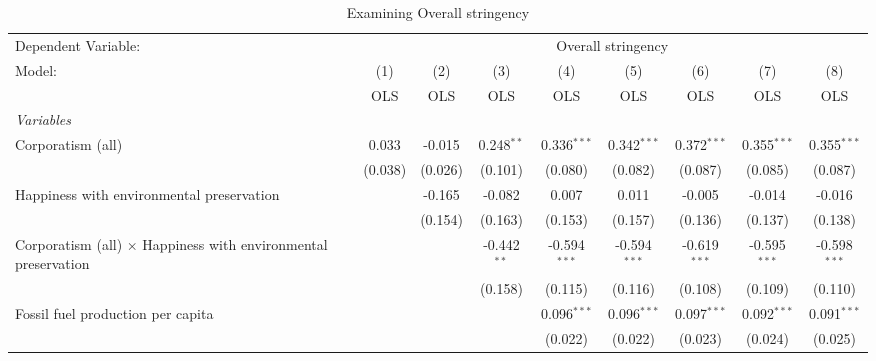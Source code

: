 
\begin{table}[htbp]
   \caption{Examining Overall stringency}
   \centering
   \begin{tabular}{lcccccccc}
      \toprule
      Dependent Variable: & \multicolumn{8}{c}{Overall stringency}\\
      Model:                                                                & (1)     & (2)     & (3)           & (4)            & (5)            & (6)            & (7)            & (8)\\  
                                                                            &  OLS    & OLS     & OLS           & OLS            & OLS            & OLS            & OLS            & OLS\\  
      \midrule
      \emph{Variables}\\
      Corporatism (all)                                                     & 0.033   & -0.015  & 0.248$^{**}$  & 0.336$^{***}$  & 0.342$^{***}$  & 0.372$^{***}$  & 0.355$^{***}$  & 0.355$^{***}$\\   
                                                                            & (0.038) & (0.026) & (0.101)       & (0.080)        & (0.082)        & (0.087)        & (0.085)        & (0.087)\\   
      Happiness with environmental preservation                             &         & -0.165  & -0.082        & 0.007          & 0.011          & -0.005         & -0.014         & -0.016\\   
                                                                            &         & (0.154) & (0.163)       & (0.153)        & (0.157)        & (0.136)        & (0.137)        & (0.138)\\   
      Corporatism (all) $\times$ Happiness with environmental preservation  &         &         & -0.442$^{**}$ & -0.594$^{***}$ & -0.594$^{***}$ & -0.619$^{***}$ & -0.595$^{***}$ & -0.598$^{***}$\\   
                                                                            &         &         & (0.158)       & (0.115)        & (0.116)        & (0.108)        & (0.109)        & (0.110)\\   
      Fossil fuel production per capita                                     &         &         &               & 0.096$^{***}$  & 0.096$^{***}$  & 0.097$^{***}$  & 0.092$^{***}$  & 0.091$^{***}$\\   
                                                                            &         &         &               & (0.022)        & (0.022)        & (0.023)        & (0.024)        & (0.025)\\   

\end{tabular}
\end{table}
